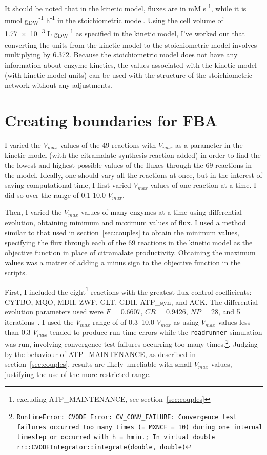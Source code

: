 \documentclass[parskip=full]{scrreprt}
\begin{document}
It should be noted that in the kinetic model, fluxes are in mM s\textsuperscript{-1}, while it is mmol g\textsubscript{DW}\textsuperscript{-1} h\textsuperscript{-1} in the stoichiometric model. Using the cell volume of \num{1.77e-3} L g\textsubscript{DW}\textsuperscript{-1} as specified in the kinetic model, I’ve worked out that converting the units from the kinetic model to the stoichiometric model involves multiplying by 6.372. Because the stoichiometric model does not have any information about enzyme kinetics, the values associated with the kinetic model (with kinetic model units) can be used with the structure of the stoichiometric network without any adjustments.

\section{Creating boundaries for FBA}
\label{sec:bounds}

I varied the $V_{max}$ values of the 49 reactions with $V_{max}$ as a parameter in the kinetic model (with the citramalate synthesis reaction added) in order to find the the lowest and highest possible values of the fluxes through the 69 reactions in the model. Ideally, one should vary all the reactions at once, but in the interest of saving computational time, I first varied $V_{max}$ values of one reaction at a time. I did so over the range of 0.1-10.0 $V_{max}$.

Then, I varied the $V_{max}$ values of many enzymes at a time using differential evolution, obtaining minimum and maximum values of flux. I used a method similar to that used in section~\ref{sec:couples} to obtain the minimum values, specifying the flux through each of the 69 reactions in the kinetic model as the objective function in place of citramalate productivity. Obtaining the maximum values was a matter of adding a minus sign to the objective function in the scripts.

First, I included the eight\footnote{excluding ATP\_MAINTENANCE, see section~\ref{sec:couples}} reactions with the greatest flux control coefficients: CYTBO, MQO, MDH, ZWF, GLT, GDH, ATP\_syn, and ACK. The differential evolution parameters used were $F$ = 0.6607, $CR$ = 0.9426, $NP$ = 28, and 5 iterations~\cite{pedersen_good_2010}. I used the $V_{max}$ range of of 0.3--10.0 $V_{max}$ as using $V_{max}$ values less than 0.3 $V_{max}$ tended to produce run time errors while the \texttt{roadrunner} simulation was run, involving convergence test failures occurring too many times.\footnote{\texttt{RuntimeError: CVODE Error: CV\_CONV\_FAILURE: Convergence test failures occurred too many times (= MXNCF = 10) during one internal timestep or occurred with \textbar{}h\textbar{} = hmin.; In virtual double rr::CVODEIntegrator::integrate(double, double)}}. Judging by the behaviour of ATP\_MAINTENANCE, as described in section~\ref{sec:couples}, results are likely unreliable with small $V_{max}$ values, justifying the use of the more restricted range.
\end{document}
